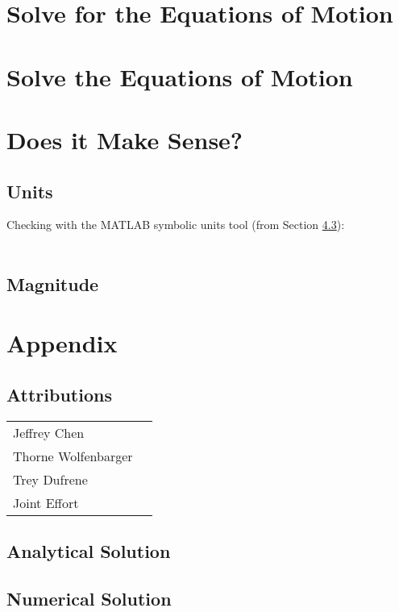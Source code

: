 \documentclass[12pt]{report}
\begin{document}
\begin{flushleft}
\section{Solve for the Equations of Motion}

\newpage
\section{Solve the Equations of Motion}
\section{Does it Make Sense?}
\subsection{Units}
Checking with the MATLAB symbolic units tool (from Section \ref{appendix:numerical}): \\
~\\
% 
\subsection{Magnitude}

\section{Appendix} \label{appendix}
\subsection{Attributions}
\onehalfspacing
\begin{tabular}{ll}
Jeffrey Chen & \\
Thorne Wolfenbarger &\\
Trey Dufrene & \\
Joint Effort &
\end{tabular}
\singlespacing

\newpage
\subsection{Analytical Solution}

\newpage
\subsection{Numerical Solution} \label{appendix:numerical}
% 

\end{flushleft}
\end{document}
